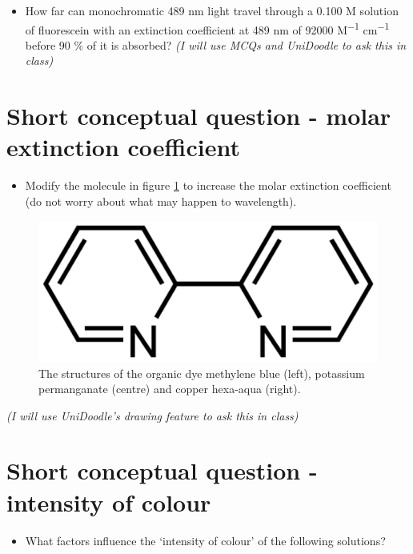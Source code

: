 \documentclass[
]{book}
\providecommand{\tightlist}{%
  \setlength{\itemsep}{0pt}\setlength{\parskip}{0pt}}
\begin{document}
\begin{itemize}
\tightlist
\item
  How far can monochromatic 489 nm light travel through a 0.100 M solution of fluorescein with an extinction coefficient at 489 nm of 92000 M\textsuperscript{−1} cm\textsuperscript{−1} before 90 \% of it is absorbed?
  \emph{(I will use MCQs and UniDoodle to ask this in class)}
\end{itemize}

\hypertarget{sec:MolarExtinction}{%
\section{Short conceptual question - molar extinction coefficient}\label{sec:MolarExtinction}}

\begin{itemize}
\tightlist
\item
  Modify the molecule in figure \ref{fig:bpy} to increase the molar extinction coefficient (do not worry about what may happen to wavelength).
\end{itemize}

\begin{figure}

{\centering \includegraphics[width=0.7\linewidth]{images/bpy} 

}

\caption{The structures of the organic dye methylene blue (left), potassium permanganate (centre) and copper hexa-aqua (right).}\label{fig:bpy}
\end{figure}

\emph{(I will use UniDoodle's drawing feature to ask this in class)}

\hypertarget{sec:intensity}{%
\section{Short conceptual question - intensity of colour}\label{sec:intensity}}

\begin{itemize}
\tightlist
\item
  What factors influence the `intensity of colour' of the following solutions?
\end{itemize}
\end{document}

